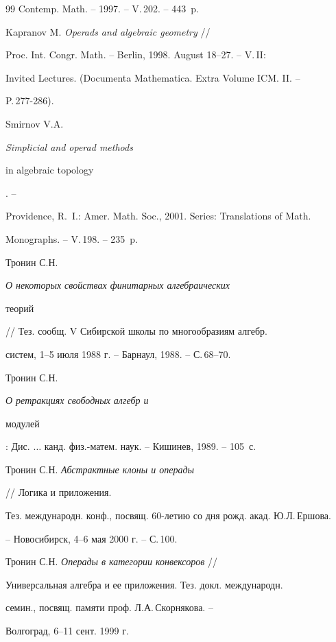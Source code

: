 \begin{thebibliography}{99}
Contemp. Math. -- 1997. -- V.\,202. -- 443~p.





 Kapranov M. {\em Operads and algebraic geometry} //


Proc. Int. Congr. Math. -- Berlin, 1998. August 18--27. -- V.\,II:


Invited Lectures. (Documenta Mathematica. Extra Volume ICM. II. --


P.\,277-286).





 Smirnov V.A. {\em Simplicial and operad methods


in algebraic topology}. --


Providence, R.~I.: Amer. Math. Soc., 2001. Series: Translations of Math.


Monographs. -- V.\,198. -- 235~p.





 Тронин С.Н. {\em О некоторых свойствах финитарных алгебраических


теорий} // Тез. сообщ. V Сибирской школы по многообразиям алгебр.


систем, 1--5 июля 1988 г. -- Барнаул, 1988. -- С.\,68--70.





 Тронин С.Н. {\em О ретракциях свободных алгебр и


модулей}: Дис. $\dotsc$ канд. физ.-матем. наук. -- Кишинев, 1989. -- 105~с.





 Тронин С.Н. {\em Абстрактные клоны и операды}


// Логика и приложения.


Тез. международн. конф., посвящ. 60-летию со дня рожд. акад. Ю.Л.\,Ершова.


-- Новосибирск, 4--6 мая 2000 г. -- С.\,100.





 Тронин С.Н. {\em Операды в категории конвексоров} //


Универсальная алгебра и ее приложения. Тез. докл. международн.


семин., посвящ. памяти проф. Л.А.\,Скорнякова. --


Волгоград, 6--11 сент. 1999 г.



\end{thebibliography}
